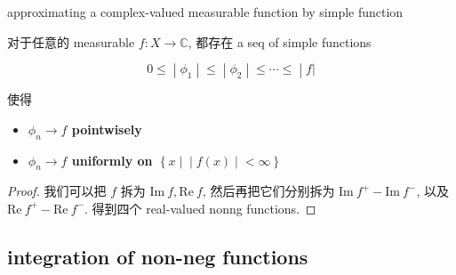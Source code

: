 \documentclass{qlnotes-export}
\begin{document}
\begin{corollary}{approximating a complex-valued measurable function by simple function}\label{cor-04-measurable-functions-and-integration-on-l-mu-approximating-a-complex-valued-measurable-function-by-simple-fun}

对于任意的 measurable \(f:X\rightarrow{\mathbb{C}}\), 都存在 a seq of simple functions

\[\left. 0 \leq \middle| \phi_{1} \middle| \leq \middle| \phi_{2} \middle| \leq \cdots \leq \middle| f| \right.\]

使得

\begin{itemize}
\item
  \textbf{\(\phi_{n}\rightarrow f\) pointwisely}
\item
  \textbf{\(\phi_{n}\rightarrow f\) uniformly on \(\left\{ x \mid \middle| f(x) \middle| < \infty \right\}\)}
\end{itemize}

\end{corollary}

\begin{proof}

我们可以把 \(f\) 拆为 \(\text{Im}\ f,\text{Re}\ f\), 然后再把它们分别拆为 \(\text{Im}\ f^{+} - \text{Im}\ f^{-}\), 以及 \(\text{Re}\ f^{+} - \text{Re}\ f^{-}\). 得到四个 real-valued nonng functions.

\end{proof}

\subsection{integration of non-neg functions}\label{integration-of-non-neg-functions}
\end{document}
